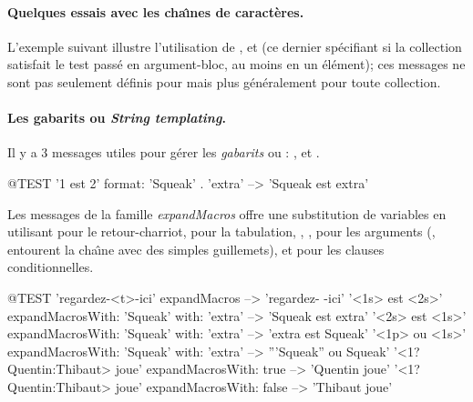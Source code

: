 \documentclass[a4paper,10pt,twoside]{book}
\begin{document}
\paragraph{Quelques essais avec les cha\^{\i}nes de caract\`eres.} 
L'exemple suivant illustre l'utilisation de ,  et  
(ce dernier sp\'ecifiant si la collection satisfait le test pass\'e en argument-bloc, au moins en un \'el\'ement);
ces messages ne sont pas seulement d\'efinis pour  mais plus g\'en\'eralement pour toute collection.


\paragraph{Les gabarits ou \emph{String templating}.}
Il y a 3 messages utiles pour g\'erer les \emph{gabarits} ou : ,  et .

\begin{code}{@TEST}
'{1} est {2}' format: {'Squeak' . 'extra'}  --> 'Squeak est extra'
\end{code}

Les messages de la famille \emph{expandMacros} offre une substitution
de variables en utilisant  pour le retour-charriot,  
pour la tabulation, , ,  pour les arguments
(,  entourent la cha\^{\i}ne avec des simples guillemets),
et  pour les clauses conditionnelles.


\begin{code}{@TEST}
'regardez-<t>-ici' expandMacros                                         --> 'regardez-	-ici'
'<1s> est <2s>' expandMacrosWith: 'Squeak' with: 'extra'   --> 'Squeak est extra'
'<2s> est <1s>' expandMacrosWith: 'Squeak' with: 'extra'   --> 'extra est Squeak'
'<1p> ou <1s>' expandMacrosWith: 'Squeak' with: 'extra'  --> '''Squeak'' ou Squeak'
'<1?Quentin:Thibaut> joue' expandMacrosWith: true     --> 'Quentin joue'
'<1?Quentin:Thibaut> joue' expandMacrosWith: false    --> 'Thibaut joue'
\end{code}
\end{document}
